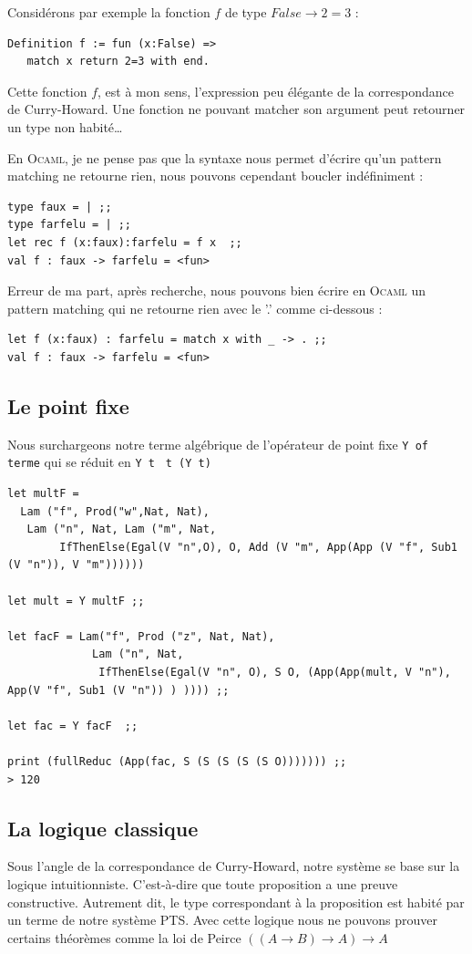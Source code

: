Considérons par exemple la fonction $f$ de type $False \rightarrow 2=3$ :
\begin{verbatim}
Definition f := fun (x:False) => 
   match x return 2=3 with end.
\end{verbatim}
Cette fonction $f$, est à mon sens, l'expression peu élégante de la correspondance 
de Curry-Howard. Une fonction ne pouvant matcher son argument peut retourner un type non habité\dots

En \textsc{Ocaml}, je ne pense pas que la syntaxe nous permet d'écrire qu'un pattern matching
ne retourne rien, nous pouvons cependant boucler indéfiniment :
\begin{verbatim}
type faux = | ;;
type farfelu = | ;;
let rec f (x:faux):farfelu = f x  ;;
val f : faux -> farfelu = <fun>
\end{verbatim}

Erreur de ma part, après recherche, nous pouvons bien écrire en \textsc{Ocaml} un pattern matching
qui ne retourne rien avec le '.' comme ci-dessous :
\begin{verbatim}
let f (x:faux) : farfelu = match x with _ -> . ;;
val f : faux -> farfelu = <fun>
\end{verbatim}

\subsection{Le point fixe}
Nous surchargeons notre terme algébrique de l'opérateur de point fixe \texttt{Y of terme} qui
se réduit en \texttt{Y t} \imp\ \texttt{t (Y t)}
\begin{verbatim}
let multF = 
  Lam ("f", Prod("w",Nat, Nat),
   Lam ("n", Nat, Lam ("m", Nat, 
        IfThenElse(Egal(V "n",O), O, Add (V "m", App(App (V "f", Sub1 (V "n")), V "m"))))))

let mult = Y multF ;;

let facF = Lam("f", Prod ("z", Nat, Nat), 
             Lam ("n", Nat,
              IfThenElse(Egal(V "n", O), S O, (App(App(mult, V "n"), App(V "f", Sub1 (V "n")) ) )))) ;;

let fac = Y facF  ;;

print (fullReduc (App(fac, S (S (S (S (S O))))))) ;;
> 120
\end{verbatim}

\subsection{La logique classique}
Sous l'angle de la correspondance de Curry-Howard, notre système se base sur la logique intuitionniste.
C'est-à-dire que toute proposition a une preuve constructive.
 Autrement dit, le type correspondant à la proposition est habité par un terme de notre système PTS.
Avec cette logique nous ne pouvons prouver certains théorèmes comme la loi de Peirce $((A\rightarrow B)\rightarrow A)\rightarrow A$


